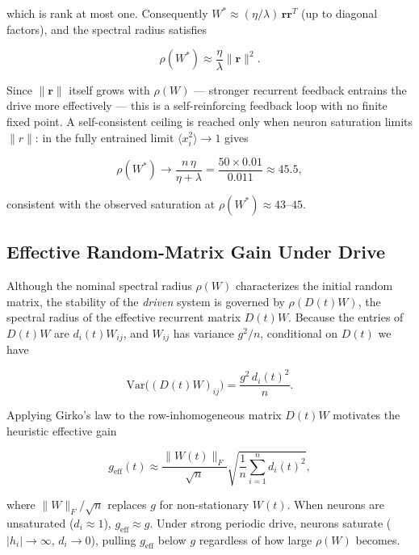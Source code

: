 \documentclass[paper=a4, fontsize=11pt]{scrartcl} %
\numberwithin{equation}{section} %
\numberwithin{figure}{section} %
\numberwithin{table}{section} %
\begin{document}
which is rank at most one.  Consequently $W^* \approx (\eta/\lambda)\,\mathbf{r}\mathbf{r}^T$
(up to diagonal factors), and the spectral radius satisfies

\begin{equation}
    \rho(W^*) \approx \frac{\eta}{\lambda}\|\mathbf{r}\|^2.
\end{equation}

Since $\|\mathbf{r}\|$ itself grows with $\rho(W)$ — stronger recurrent feedback
entrains the drive more effectively — this is a self-reinforcing feedback loop with
no finite fixed point.  A self-consistent ceiling is reached only when neuron
saturation limits $\|r\|$: in the fully entrained limit $\langle x_i^2\rangle \to 1$
gives

\begin{equation}
    \rho(W^*) \to \frac{n\,\eta}{\eta + \lambda} = \frac{50 \times 0.01}{0.011} \approx 45.5,
\end{equation}

consistent with the observed saturation at $\rho(W^*) \approx 43$--$45$.

\subsection{Effective Random-Matrix Gain Under Drive}

Although the nominal spectral radius $\rho(W)$ characterizes the initial random
matrix, the stability of the \emph{driven} system is governed by $\rho(D(t)W)$, the
spectral radius of the effective recurrent matrix $D(t)W$.  Because the entries of
$D(t)W$ are $d_i(t) W_{ij}$, and $W_{ij}$ has variance $g^2/n$, conditional on
$D(t)$ we have

\begin{equation}
    \mathrm{Var}\bigl((D(t)W)_{ij}\bigr) = \frac{g^2\,d_i(t)^2}{n}.
\end{equation}

Applying Girko's law to the row-inhomogeneous matrix $D(t)W$ motivates the heuristic
effective gain

\begin{equation}
    g_{\mathrm{eff}}(t) \approx \frac{\|W(t)\|_F}{\sqrt{n}}\sqrt{\frac{1}{n}\sum_{i=1}^n d_i(t)^2},
    \label{eq:geff}
\end{equation}

where $\|W\|_F/\sqrt{n}$ replaces $g$ for non-stationary $W(t)$.  When neurons are
unsaturated ($d_i \approx 1$), $g_{\mathrm{eff}} \approx g$.  Under strong periodic
drive, neurons saturate ($|h_i| \to \infty$, $d_i \to 0$), pulling $g_{\mathrm{eff}}$
below $g$ regardless of how large $\rho(W)$ becomes.
\end{document}
